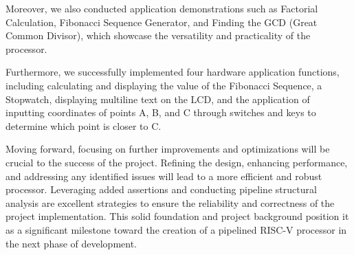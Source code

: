 \documentclass[12pt,a4paper,oneside]{book} %
\begin{document}
Moreover, we also conducted application demonstrations such as Factorial Calculation, Fibonacci Sequence Generator, and Finding the GCD (Great Common Divisor), which showcase the versatility and practicality of the processor. 

Furthermore, we successfully implemented four hardware application functions, including calculating and displaying the  value of the Fibonacci Sequence, a Stopwatch, displaying multiline text on the LCD, and the application of inputting coordinates of points A, B, and C through switches and keys to determine which point is closer to C.

Moving forward, focusing on further improvements and optimizations will be crucial to the success of the project. Refining the design, enhancing performance, and addressing any identified issues will lead to a more efficient and robust processor. Leveraging added assertions and conducting pipeline structural analysis are excellent strategies to ensure the reliability and correctness of the project implementation. This solid foundation and project background position it as a significant milestone toward the creation of a pipelined RISC-V processor in the next phase of development.




\end{document}
